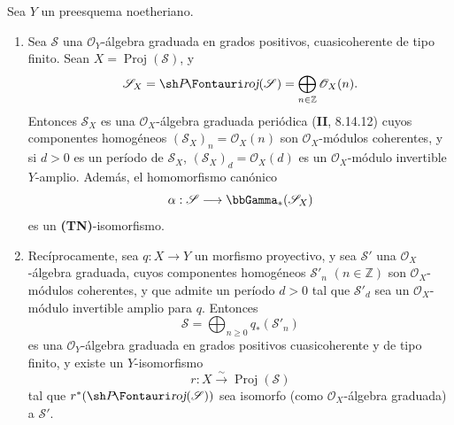 \begin{proposition}[2.3.4]
\label{III.2.3.4-fr}
Sea $Y$ un preesquema noetheriano.
\begin{enumerate}
\item[{\rm(i)}] Sea $\mathcal S$ una $\mathcal O_Y$-álgebra graduada en grados positivos, cuasicoherente de tipo finito. Sean $X=\operatorname{Proj}(\mathcal S)$, y
\[
\mathcal S_X=\shProj(\mathcal S)
=\bigoplus_{n\in\mathbb Z}\mathcal O_X(n).
\]
Entonces $\mathcal S_X$ es una $\mathcal O_X$-álgebra graduada periódica \textup{(\textbf{II}, 8.14.12)} cuyos componentes homogéneos $(\mathcal S_X)_n=\mathcal O_X(n)$ son $\mathcal O_X$-módulos coherentes, y si $d>0$ es un período de $\mathcal S_X$, $(\mathcal S_X)_d=\mathcal O_X(d)$ es un $\mathcal O_X$-módulo invertible $Y$-amplio. Además, el homomorfismo canónico
\[
\alpha:\mathcal S\longrightarrow\bbGamma_*(\mathcal S_X)
\]
es un \textup{\textbf{(TN)}}-isomorfismo.
\item[{\rm(ii)}] Recíprocamente, sea $q:X\to Y$ un morfismo proyectivo, y sea $\mathcal S'$ una $\mathcal O_X$-álgebra graduada, cuyos componentes homogéneos $\mathcal S'_n$ $(n\in\mathbb Z)$ son $\mathcal O_X$-módulos coherentes, y que admite un período $d>0$ tal que $\mathcal S'_d$ sea un $\mathcal O_X$-módulo invertible amplio para $q$. Entonces
\[
\mathcal S=\bigoplus_{n\geq0}q_*(\mathcal S'_n)
\]
es una $\mathcal O_Y$-álgebra graduada en grados positivos cuasicoherente y de tipo finito, y existe un $Y$-isomorfismo
\[
r:X\xrightarrow{\sim}\operatorname{Proj}(\mathcal S)
\]
tal que $r^*(\shProj(\mathcal S))$ sea isomorfo (como $\mathcal O_X$-álgebra graduada) a $\mathcal S'$.
\end{enumerate}
\end{proposition}

